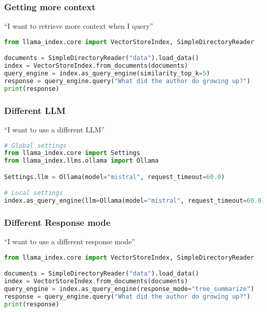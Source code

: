 \begin{frame}[fragile]\frametitle{Getting more context}

``I want to retrieve more context when I query''

\begin{lstlisting}[language=Python]
from llama_index.core import VectorStoreIndex, SimpleDirectoryReader

documents = SimpleDirectoryReader("data").load_data()
index = VectorStoreIndex.from_documents(documents)
query_engine = index.as_query_engine(similarity_top_k=5)
response = query_engine.query("What did the author do growing up?")
print(response)
\end{lstlisting}
\end{frame}


\begin{frame}[fragile]\frametitle{Different LLM}

``I want to use a different LLM''

\begin{lstlisting}[language=Python]
# Global settings
from llama_index.core import Settings
from llama_index.llms.ollama import Ollama

Settings.llm = Ollama(model="mistral", request_timeout=60.0)

# Local settings
index.as_query_engine(llm=Ollama(model="mistral", request_timeout=60.0))
\end{lstlisting}
\end{frame}

\begin{frame}[fragile]\frametitle{Different Response mode}

``I want to use a different response mode''

\begin{lstlisting}[language=Python]
from llama_index.core import VectorStoreIndex, SimpleDirectoryReader

documents = SimpleDirectoryReader("data").load_data()
index = VectorStoreIndex.from_documents(documents)
query_engine = index.as_query_engine(response_mode="tree_summarize")
response = query_engine.query("What did the author do growing up?")
print(response)
\end{lstlisting}
\end{frame}

